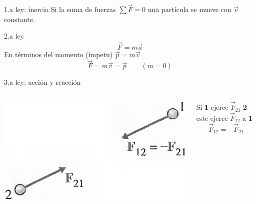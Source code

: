 \documentclass[serif]{beamer}
\begin{document}
\begin{frame}
\begin{block}{1.a ley: inercia}
Si la suma de fuerzas \(\sum \vec{F} = 0\) una partícula se mueve con \(\vec{v}\) constante.
\end{block}
\pause
\begin{block}{2.a ley}
\[
\vec{F}= m \vec{a}
\]
\pause
En términos del momento {\tiny (ímpetu)}  \(\vec{p}= m \vec{v}\)
\[
\vec{F} = m \dot{\vec{v}}= \dot{\vec{p}}\qquad (\dot{m}=0 )
\]
\end{block}
\pause
\begin{block}{3.a ley: acción y reacción}
\begin{columns}[c]
	\begin{column}{0.35\textwidth}
		\includegraphics[width=\textwidth]{taylor1_5}
	\end{column}
	\begin{column}{0.65\textwidth}
		Si \textbf{1} ejerce \(\vec{F}_{21}\)  \textbf{2} este ejerce \(\vec{F}_{12}\) a \textbf{1}
		\[
			\vec{F}_{12} = - \vec{F}_{21}
		\]
	\end{column}
\end{columns}
\end{block}

\end{frame}
\end{document}

